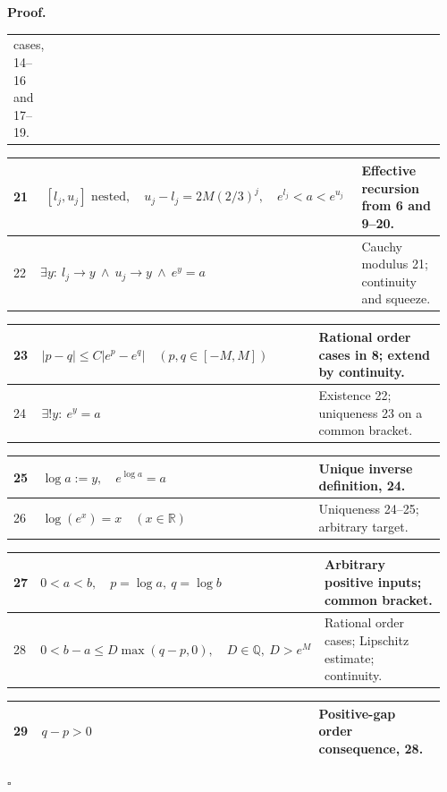\documentclass[11pt,reqno]{amsart}
\theoremstyle{redplain}
\renewcommand{\qedsymbol}{\textcolor{proofqed}{\ensuremath{\square}}}
\renewenvironment{proof}[1][Proof]{\par\noindent\textbf{\textcolor{proofhead}{#1.}}\par\nobreak}{\par\nobreak\hfill\qedsymbol}
\numberwithin{equation}{section}
\begin{document}
\begin{proof}
\begin{tabular}{|@{}p{0.06\linewidth}p{0.61\linewidth}p{0.29\linewidth}}
cases, 14--16 and 17--19. \\ 
\end{tabular}%
\noindent \text{ \ }\newline
\noindent 
\begin{tabular}{|@{}p{0.06\linewidth}p{0.61\linewidth}p{0.29\linewidth}}
\hline
21 & $\begin{gathered}{}[l_j,u_j]\text{ nested},\quad
u_j-l_j=2M(2/3)^j,\quad e^{l_j}<a<e^{u_j}\end{gathered}$ & Effective
recursion from 6 and 9--20. \\ \hline
22 & $\exists y:\ l_j\to y\ \land\ u_j\to y\ \land\ e^y=a$ & Cauchy modulus
21; continuity and squeeze. \\ 
\end{tabular}%
\noindent \text{ \ }\newline
\noindent 
\begin{tabular}{|@{}p{0.06\linewidth}p{0.61\linewidth}p{0.29\linewidth}}
\hline
23 & $|p-q|\le C|e^p-e^q|\quad(p,q\in[-M,M])$ & Rational order cases in 8;
extend by continuity. \\ \hline
24 & $\exists! y:\ e^y=a$ & Existence 22; uniqueness 23 on a common bracket.
\\ 
\end{tabular}%
\noindent \text{ \ }\newline
\noindent  
\begin{tabular}{|@{}p{0.06\linewidth}p{0.61\linewidth}p{0.29\linewidth}}
\hline
25 & $\log a:=y,\quad e^{\log a}=a$ & Unique inverse definition, 24. \\ 
\hline
26 & $\log(e^x)=x\quad(x\in\mathbb{R})$ & Uniqueness 24--25; arbitrary
target. \\ 
\end{tabular}%
\noindent \text{ \ }\newline
\noindent 
\begin{tabular}{|@{}p{0.06\linewidth}p{0.61\linewidth}p{0.29\linewidth}}
\hline
27 & $0<a<b,\quad p=\log a,\ q=\log b$ & Arbitrary positive inputs; common
bracket. \\ \hline
28 & $0<b-a\le D\max(q-p,0),\quad D\in\mathbb{Q},\ D>e^M$ & Rational order
cases; Lipschitz estimate; continuity. \\ 
\end{tabular}%
\noindent \text{ \ }\newline
\noindent  
\begin{tabular}{|@{}p{0.06\linewidth}p{0.61\linewidth}p{0.29\linewidth}}
\hline
29 & $q-p>0$ & Positive-gap order consequence, 28. \\ \hline

\end{tabular}
\end{proof}
\end{document}
